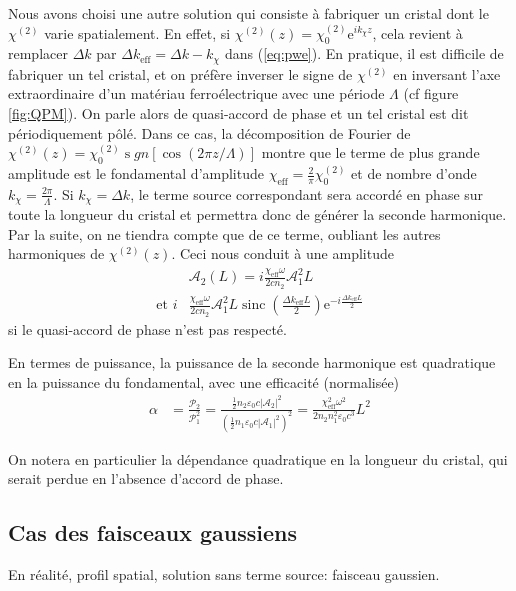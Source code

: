 \documentclass[11pt,a4paper] { article}
\newcommand{\A}{\mathcal A}
\newcommand{\e}[1]{\text{e}^{#1}}
\newcommand{\mathsc}[1]{\mathrm{\scriptscriptstyle {#1}}}
\begin{document}
Nous avons choisi une autre solution qui consiste à fabriquer un cristal dont le $\chi^{(2)}$ varie spatialement. En effet, si $\chi^{(2)}(z) = \chi^{(2)}_0 \e{i k_\chi z}$, cela revient à remplacer $\Delta k$ par $\Delta k_\mathsc{eff} = \Delta k - k_\chi$ dans (\ref{eq:pwe}). En pratique, il est difficile de fabriquer un tel cristal, et on préfère inverser le signe de $\chi^{(2)}$ en inversant l'axe extraordinaire d'un matériau ferroélectrique avec une période $\Lambda$ (cf figure \ref{fig:QPM}). On parle alors de quasi-accord de phase et un tel cristal est dit périodiquement pôlé. Dans ce cas, la décomposition de Fourier de $\chi^{(2)}(z) = \chi^{(2)}_0 \operatorname sgn[\cos(2\pi z/ \Lambda)]$ montre que le terme de plus grande amplitude est le fondamental d'amplitude $\chi_\mathsc{eff} = \frac2\pi \chi^{(2)}_0$ et de nombre d'onde $k_\chi = \frac{2\pi}{\Lambda}$. Si $k_\chi = \Delta k$, le terme source correspondant sera accordé en phase sur toute la longueur du cristal et permettra donc de générer la seconde harmonique. Par la suite, on ne tiendra compte que de ce terme, oubliant les autres harmoniques de $\chi^{(2)}(z)$.
Ceci nous conduit à une amplitude 
\begin{align}
	&\A_2(L) = i \frac{\chi_\mathsc{eff} \omega}{2 cn_2} \A_1^2L \\	
	\text{et } i &\frac{\chi_\mathsc{eff}\omega}{2 cn_2} \A_1^2 L \operatorname{sinc}\left( \frac{\Delta k_\mathsc{eff} L}{2} \right) 
	\e{-i\frac{\Delta k_\mathsc{eff} L}{2}}
\end{align}
si le quasi-accord de phase n'est pas respecté.

En termes de puissance, la puissance de la seconde harmonique est quadratique en la puissance du fondamental, avec une efficacité (normalisée)
\begin{align}
	\alpha &= \frac{\mathcal P_2}{\mathcal P_1^2} = \frac{\frac12 n_2 \varepsilon_0 c |\A_2|^2}{\left(\frac12 n_1 \varepsilon_0 c |\A_1|^2\right)^2} 
	= \frac{\chi_\mathsc{eff}^2\omega^2}{2 n_2 n_1^2 \varepsilon_0 c^3} L^2
\end{align}

On notera en particulier la dépendance quadratique en la longueur du cristal, qui serait perdue en l'absence d'accord de phase.

\subsection{Cas des faisceaux gaussiens}

En réalité, profil spatial, solution sans terme source: faisceau gaussien.
\end{document}

